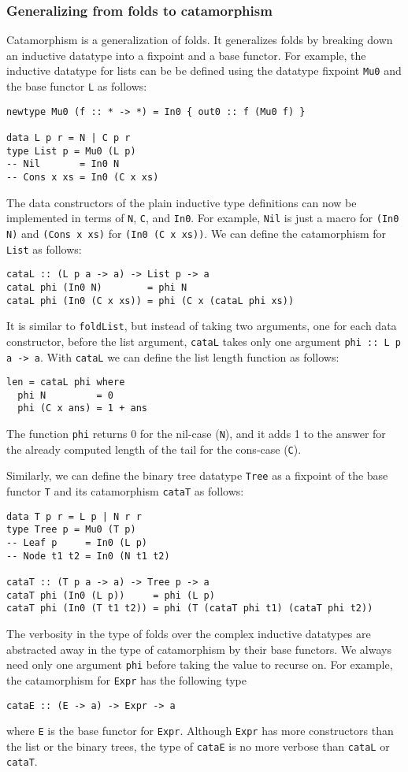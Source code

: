 \documentclass[letterpaper,12pt]{article}
\begin{document}
\subsubsection{Generalizing from folds to catamorphism}
Catamorphism is a generalization of folds.
It generalizes folds by breaking down an inductive datatype
into a fixpoint and a base functor.
For example, the inductive datatype for lists
can be be defined using the datatype fixpoint \verb|Mu0|
and the base functor \verb|L| as follows:
\begin{verbatim}
newtype Mu0 (f :: * -> *) = In0 { out0 :: f (Mu0 f) }

data L p r = N | C p r
type List p = Mu0 (L p)
-- Nil       = In0 N
-- Cons x xs = In0 (C x xs)
\end{verbatim}
The data constructors of the plain inductive type definitions can now
be implemented in terms of \verb|N|, \verb|C|, and \verb|In0|.
For example, \verb|Nil| is just a macro for \verb|(In0 N)|
and  \verb|(Cons x xs)| for  \verb|(In0 (C x xs))|.
We can define the catamorphism for \verb|List| as follows:
\begin{verbatim}
cataL :: (L p a -> a) -> List p -> a
cataL phi (In0 N)        = phi N
cataL phi (In0 (C x xs)) = phi (C x (cataL phi xs))
\end{verbatim}
It is similar to \verb|foldList|, but instead of taking two arguments,
one for each data constructor, before the list argument, \verb|cataL|
takes only one argument \verb|phi :: L p a -> a|.
With \verb|cataL| we can define the list length function as follows:
\begin{verbatim}
len = cataL phi where
  phi N         = 0
  phi (C x ans) = 1 + ans
\end{verbatim}
The function \verb|phi| returns 0 for the nil-case (\verb|N|), and
it adds 1 to the answer for the already computed length of the tail
for the cons-case (\verb|C|).

Similarly, we can define the binary tree datatype \verb|Tree|
as a fixpoint of the base functor \verb|T|
and its catamorphism \verb|cataT| as follows:
\begin{verbatim}
data T p r = L p | N r r
type Tree p = Mu0 (T p)
-- Leaf p     = In0 (L p)
-- Node t1 t2 = In0 (N t1 t2)

cataT :: (T p a -> a) -> Tree p -> a
cataT phi (In0 (L p))     = phi (L p)
cataT phi (In0 (T t1 t2)) = phi (T (cataT phi t1) (cataT phi t2))
\end{verbatim}

The verbosity in the type of folds over the complex inductive datatypes
are abstracted away in the type of catamorphism by their base functors.
We always need only one argument \verb|phi| before taking the value to
recurse on.
For example, the catamorphism for \verb|Expr| has the following type
\begin{verbatim}
cataE :: (E -> a) -> Expr -> a
\end{verbatim}
where \verb|E| is the base functor for \verb|Expr|.
Although \verb|Expr| has more constructors than
the list or the binary trees, the type of \verb|cataE| is
no more verbose than \verb|cataL| or \verb|cataT|.
\end{document}
